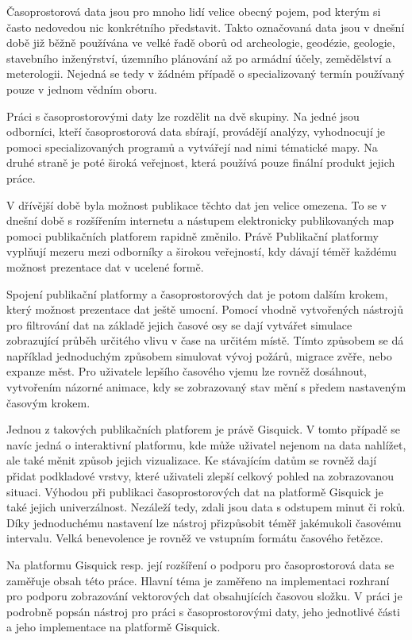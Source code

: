 
Časoprostorová data jsou pro mnoho lidí velice obecný pojem, pod
kterým si často nedovedou nic konkrétního představit. Takto označovaná
data jsou v dnešní době již běžně používána ve velké řadě oborů od
archeologie, geodézie, geologie, stavebního inženýrství, územního
plánování až po armádní účely, zemědělství a meterologii. Nejedná se
tedy v žádném případě o specializovaný termín používaný pouze v jednom
vědním oboru.

Práci s časoprostorovými daty lze rozdělit na dvě skupiny. Na jedné
jsou odborníci, kteří časoprostorová data sbírají, provádějí analýzy,
vyhodnocují je pomoci specializovaných programů a vytvářejí nad nimi
tématické mapy. Na druhé straně je poté široká veřejnost, která
používá pouze finální produkt jejich práce.

V dřívější době byla možnost publikace těchto dat jen velice
omezena. To se v dnešní době s rozšířením internetu a nástupem
elektronicky publikovaných map pomoci publikačních platforem rapidně
změnilo. Právě Publikační platformy vyplňují mezeru mezi odborníky a
širokou veřejností, kdy dávají téměř každému možnost prezentace dat v
ucelené formě.


Spojení publikační platformy a časoprostorových dat je potom dalším
krokem, který možnost prezentace dat ještě umocní. Pomocí vhodně
vytvořených nástrojů pro filtrování dat na základě jejich časové osy
se dají vytvářet simulace zobrazující průběh určitého vlivu v čase na
určitém místě. Tímto způsobem se dá například jednoduchým způsobem
simulovat vývoj požárů, migrace zvěře, nebo expanze měst. Pro
uživatele lepšího časového vjemu lze rovněž dosáhnout, vytvořením
názorné animace, kdy se zobrazovaný stav mění s předem nastaveným
časovým krokem.

Jednou z takových publikačních platforem je právě Gisquick. V tomto
případě se navíc jedná o interaktivní platformu, kde může uživatel
nejenom na data nahlížet, ale také měnit způsob jejich vizualizace. Ke
stávajícím datům se rovněž dají přidat podkladové vrstvy, které
uživateli zlepší celkový pohled na zobrazovanou situaci. Výhodou při
publikaci časoprostorových dat na platformě Gisquick je také jejich
univerzálnost. Nezáleží tedy, zdali jsou data s odstupem minut či
roků. Díky jednoduchému nastavení lze nástroj přizpůsobit téměř
jakémukoli časovému intervalu. Velká benevolence je rovněž ve vstupním
formátu časového řetězce.

\bigskip
Na platformu Gisquick resp. její rozšíření o podporu pro
časoprostorová data se zaměřuje obsah této práce. Hlavní téma je
zaměřeno na implementaci rozhraní pro podporu zobrazování vektorových
dat obsahujících časovou složku. V práci je podrobně popsán nástroj
pro práci s časoprostorovými daty, jeho jednotlivé části a jeho
implementace na platformě Gisquick.

